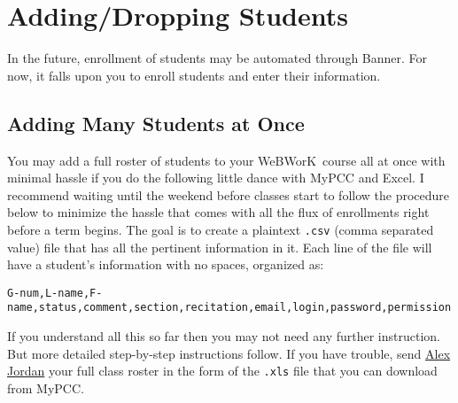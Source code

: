 \documentclass[12pt]{article}
\newcommand{\WW}{WeBWorK}
\begin{document}
\section{Adding/Dropping Students}
In the future, enrollment of students may be automated through Banner.
For now, it falls upon you to enroll students and enter their information.

\subsection{Adding Many Students at Once}
You may add a full roster of students to your \WW\ course all at once with minimal hassle if you do the following little dance with MyPCC and Excel.
I recommend waiting until the weekend before classes start to follow the procedure below to minimize the hassle that comes with all the flux of enrollments right before a term begins.
The goal is to create a plaintext \texttt{.csv} (comma separated value) file that has all the pertinent information in it.
Each line of the file will have a student's information with no spaces, organized as:\\ 

\small \centerline{\texttt{G-num,L-name,F-name,status,comment,section,recitation,email,login,password,permission}} \normalsize \vspace{1pc} 

If you understand all this so far then you may not need any further instruction.
But more detailed step-by-step instructions follow.
If you have trouble, send \href{mailto:alex.jordan@pcc.edu}{Alex Jordan} your full class roster in the form of the \texttt{.xls} file that you can download from MyPCC.
\end{document}
